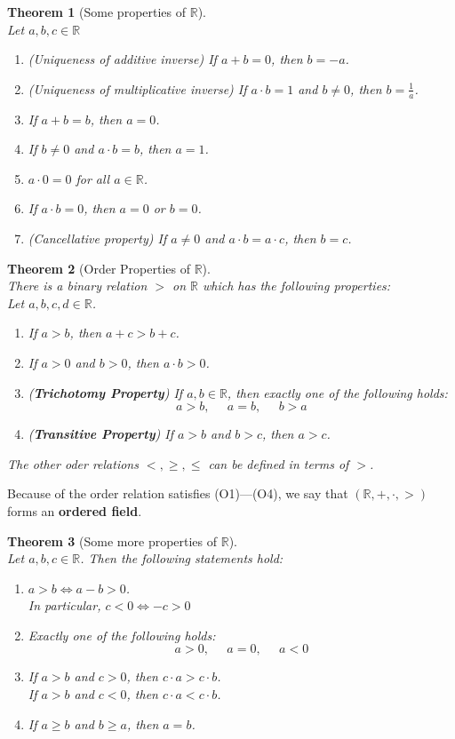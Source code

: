 \documentclass[12pt]{article}
\newtheorem{theorem}{Theorem}[section]
\theoremstyle{definition}
\begin{document}
\begin{theorem}[Some properties of $\mathbb{R}$]
\hfill\\
\normalfont Let $a,b,c\in\mathbb{R}$
\begin{enumerate}[label=(\roman*)]
\item (\textit{Uniqueness of additive inverse}) If $a+b=0$, then $b=-a$.
\item (\textit{Uniqueness of multiplicative inverse}) If $a\cdot b = 1$ and $b\neq 0$, then $b=\frac{1}{a}$.
\item If $a+b=b$, then $a = 0$.
\item If $b\neq 0$ and $a\cdot b = b$, then $a = 1$.
\item $a\cdot 0 = 0$ for all $a\in\mathbb{R}$.
\item If $a\cdot b = 0$, then $a = 0$ or $b = 0$.
\item (\textit{Cancellative property}) If $a\neq 0$ and $a\cdot b = a\cdot c$, then $b = c$.
\end{enumerate}
\end{theorem}
\begin{theorem}[Order Properties of $\mathbb{R}$]
\hfill\\
\normalfont There is a binary relation $>$ on $\mathbb{R}$ which has the following properties:\\Let $a,b,c,d\in\mathbb{R}$.
\begin{enumerate}[label=(O\arabic*)]
\item If $a>b$, then $a+c>b+c$.
\item If $a>0$ and $b>0$, then $a\cdot b>0$.
\item (\textbf{Trichotomy Property}) If $a,b\in\mathbb{R}$, then exactly one of the following holds:
\[
a>b,\;\;\;\;\; a=b,\;\;\;\;\;b>a
\]
\item (\textbf{Transitive Property}) If $a>b$ and $b>c$, then $a>c$.
\end{enumerate}
The other oder relations $<,\geq,\leq$ can be defined in terms of $>$.
\end{theorem}
Because of the order relation satisfies (O1)---(O4), we say that $(\mathbb{R},+,\cdot,>)$ forms an \textbf{ordered field}.
\begin{theorem}[Some more properties of $\mathbb{R}$]
\hfill\\
\normalfont Let $a,b,c\in\mathbb{R}$. Then the following statements hold:
\begin{enumerate}[label=(\roman*)]
\item $a>b\Leftrightarrow a-b>0$. \\In particular, $c<0 \Leftrightarrow -c>0$
\item Exactly one of the following holds:
\[
a>0,\;\;\;\;\;a=0,\;\;\;\;\;a<0
\]
\item If $a>b$ and $c>0$, then $c\cdot a>c\cdot b$. \\If $a>b$ and $c<0$, then $c\cdot a<c\cdot b$.
\item If $a\geq b$ and $b\geq a$, then $a=b$.
\end{enumerate}
\end{theorem}
\end{document}
